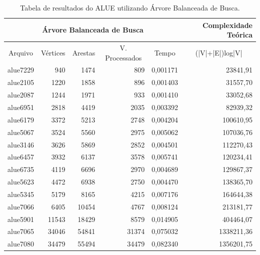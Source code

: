 \documentclass[
	12pt,				%
	oneside,			%
	a4paper,			%
	english,			%
	french,				%
	spanish,			%
	brazil,				%
	]{abntex2}
\begin{document}
\begin{table}[H]
  \centering    
  \begin{tabular}{|c|r|r|r|r|r|}
    \toprule
    \multicolumn{5}{|c|}{\cellcolor{gray!25}\textbf{Árvore Balanceada de Busca}} & \cellcolor{gray!25}\textbf{Complexidade Teórica}\\
    \midrule
    \multicolumn{1}{|c|}{\cellcolor{gray!10}Arquivo} & \multicolumn{1}{|c|}{\cellcolor{gray!10}Vértices} & \multicolumn{1}{|c|}{\cellcolor{gray!10}Arestas} & \multicolumn{1}{|c|}{\cellcolor{gray!10}V. Processados} & \multicolumn{1}{|c|}{\cellcolor{gray!10}Tempo} & \multicolumn{1}{|c|}{\cellcolor{gray!10}(|V|+|E|)log|V|}\\
    \hline
    alue7229	&	940	&	1474	&	809	&	0,001171	&	23841,91	\\
    \hline
    alue2105	&	1220	&	1858	&	896	&	0,001403	&	31557,70	\\
    \hline
    alue2087	&	1244	&	1971	&	933	&	0,001410	&	33052,68	\\
    \hline
    alue6951	&	2818	&	4419	&	2035	&	0,003392	&	82939,32	\\
    \hline
    alue6179	&	3372	&	5213	&	2748	&	0,004204	&	100610,95	\\
    \hline
    alue5067	&	3524	&	5560	&	2975	&	0,005062	&	107036,76	\\
    \hline
    alue3146	&	3626	&	5869	&	2852	&	0,004501	&	112270,43	\\
    \hline
    alue6457	&	3932	&	6137	&	3578	&	0,005741	&	120234,41	\\
    \hline
    alue6735	&	4119	&	6696	&	2970	&	0,004689	&	129867,37	\\
    \hline
    alue5623	&	4472	&	6938	&	2750	&	0,004470	&	138365,70	\\
    \hline
    alue5345	&	5179	&	8165	&	4215	&	0,007176	&	164644,38	\\
    \hline
    alue7066	&	6405	&	10454	&	4767	&	0,008124	&	213181,77	\\
    \hline
    alue5901	&	11543	&	18429	&	8579	&	0,014905	&	404464,07	\\
    \hline
    alue7065	&	34046	&	54841	&	31374	&	0,075032	&	1338211,36	\\
    \hline
    alue7080	&	34479	&	55494	&	34479	&	0,082340	&	1356201,75	\\
    \hline
  \end{tabular}
  \caption{Tabela de resultados do ALUE utilizando Árvore Balanceada de Busca.}  
  \label{tab:AlueArvore}
\end{table}
\end{document}
